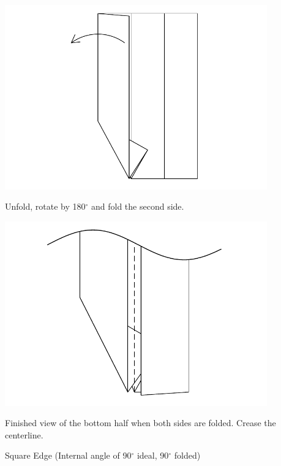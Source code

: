 \documentclass[11pt]{article}
\begin{document}
\begin{minipage}[t]{0.45\textwidth}
  \includegraphics[width=0.85\textwidth]{../figs/fig03-08}
  \begin{itemize}{\item[8.] Unfold, rotate by 180$^\circ$ and fold the second side.}\end{itemize}
\end{minipage}
\hfill
\begin{minipage}[t]{0.45\textwidth}
  \includegraphics[width=0.85\textwidth]{../figs/fig03-09}
  \begin{itemize}{\item[9.] Finished view of the bottom half when both sides are folded.  Crease the centerline.}\end{itemize}
\end{minipage}

\newpage
{\Large Square Edge}  (Internal angle of 90$^\circ$ ideal, 90$^\circ$ folded)
\vspace*{0.25in}
\end{document}
